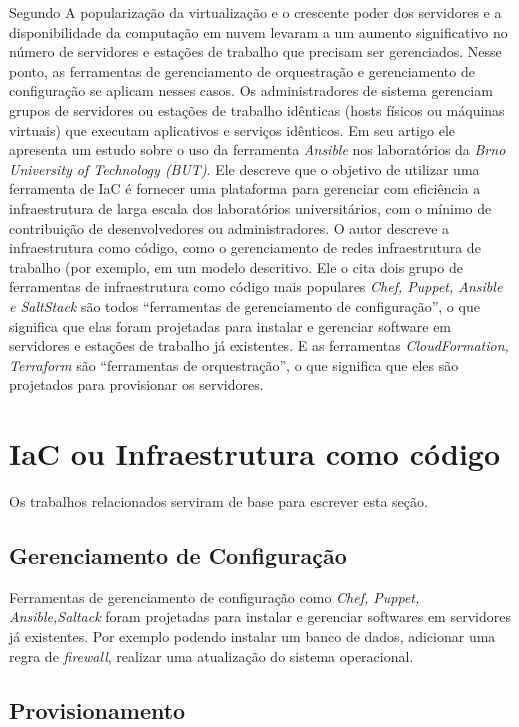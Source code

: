 \hfill

Segundo  A popularização da virtualização e o crescente poder dos servidores e a disponibilidade da computação em nuvem levaram a um aumento significativo no número de servidores e estações de trabalho que precisam ser gerenciados. Nesse ponto, as ferramentas de gerenciamento de orquestração e gerenciamento de configuração se aplicam nesses casos. Os administradores de sistema gerenciam grupos de servidores ou estações de trabalho idênticas (hosts físicos ou máquinas virtuais) que executam aplicativos e serviços idênticos. Em seu artigo ele apresenta um estudo sobre o uso da ferramenta \textit{Ansible} nos laboratórios da \textit{Brno University of Technology (BUT)}. Ele descreve que o objetivo de utilizar uma ferramenta de IaC é fornecer uma plataforma para gerenciar com eficiência a infraestrutura de larga escala dos laboratórios universitários, com o mínimo de contribuição de desenvolvedores ou administradores.
O autor descreve a infraestrutura como código, como o gerenciamento de redes infraestrutura de trabalho (por exemplo,  em um modelo descritivo. Ele o cita dois grupo de ferramentas de infraestrutura como código mais populares \textit{Chef, Puppet, Ansible e SaltStack} são todos “ferramentas de gerenciamento de configuração”, o que significa que elas foram projetadas para instalar e gerenciar software em servidores e estações de trabalho já existentes. E as ferramentas \textit{CloudFormation, Terraform} são “ferramentas de orquestração”, o que significa que eles são projetados para provisionar os servidores.


\section{\esp IaC ou Infraestrutura como código}

Os trabalhos relacionados serviram de base para escrever esta seção. 

\subsection{Gerenciamento de Configuração} 
Ferramentas de gerenciamento de configuração como \textit{Chef, Puppet, Ansible,Saltack} foram projetadas para instalar e gerenciar softwares em servidores já existentes. Por exemplo podendo instalar um banco de dados, adicionar uma regra de \textit{firewall}, realizar uma atualização do sistema operacional. 


\subsection{Provisionamento}


